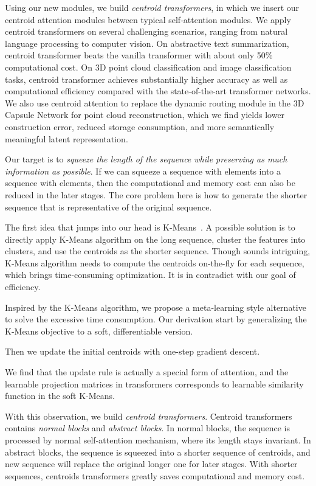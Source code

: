 \documentclass[english]{article}
\begin{document}
Using our new modules, we build \emph{centroid transformers},  in which we insert our centroid attention modules between typical self-attention modules. 
We apply centroid transformers on several challenging scenarios, ranging from natural language processing to computer vision. On abstractive text summarization, centroid transformer beats the vanilla transformer with about only 50\% computational cost. On 3D point cloud classification and image classification tasks, centroid transformer achieves substantially higher accuracy as well as computational efficiency compared with the state-of-the-art transformer networks. 
We also use centroid attention to 
replace the dynamic routing module in the 3D Capsule Network \citep{zhao20193d} for point cloud reconstruction, 
which we find yields lower construction error,
reduced storage consumption, and more semantically meaningful latent representation. 







\iffalse 
Our target is to \emph{squeeze the length of the sequence while preserving as much information as possible}. 
If we can squeeze a sequence with  elements into a sequence with  elements, then the computational and memory cost can also be reduced in the later stages.
The core problem here is how to generate the shorter sequence that is representative of the original sequence. 

The first idea that jumps into our head is K-Means~\citep{macqueen1967some}. A possible solution is to directly apply K-Means algorithm on the long sequence, cluster the features into  clusters, and use the  centroids as the shorter sequence. Though sounds intriguing, K-Means algorithm needs to compute the centroids on-the-fly for each sequence, which brings time-consuming optimization. It is in contradict with our goal of efficiency. 

Inspired by the K-Means algorithm, we propose a meta-learning style alternative to solve the excessive time consumption. Our derivation start by generalizing the K-Means objective to a soft, differentiable version. 

Then we update the initial centroids with one-step gradient descent. 

We find that the update rule is actually a special form of attention, and the learnable projection matrices in transformers corresponds to learnable similarity function in the soft K-Means. 

With this observation, we build \emph{centroid transformers}. Centroid transformers contains \emph{normal blocks} and \emph{abstract blocks}. In normal blocks, the sequence is processed by normal  self-attention mechanism, where its length stays invariant. In abstract blocks, the sequence is squeezed into a shorter sequence of centroids, and new sequence will replace the original longer one for later stages. With shorter sequences, centroids transformers greatly saves computational and memory cost.  
\end{document}
